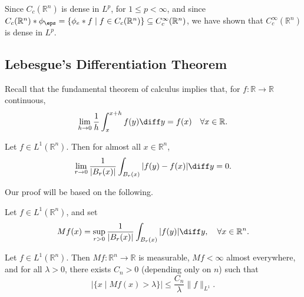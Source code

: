 \documentclass[12pt]{article}
\begin{document}
Since $C_c(\mathbb{R}^n)$ is dense in $L^p$, for $1 \leq p < \infty$, and since $C_c(\mathbb{R}^n) \ast \phi_\eps = \{\phi_e \ast f \mid f \in C_c(\mathbb{R}^n)\} \subseteq C_c^\infty(\mathbb{R}^n)$, we have shown that $C_c^\infty(\mathbb{R}^n)$ is dense in $L^p$.

\subsection{Lebesgue's Differentiation Theorem}
\label{sub:leb_diff}

Recall that the fundamental theorem of calculus implies that, for $f : \mathbb{R} \to \mathbb{R}$ continuous,
\[
\lim_{h \to 0} \frac{1}{h} \int_x^{x + h} f(y) \diff y = f(x) \quad \forall x \in \mathbb{R}.
\]

\begin{theorem}
	Let $f \in L^1(\mathbb{R}^n)$. Then for almost all $x \in \mathbb{R}^n$,
	\[
	\lim_{r \to 0} \frac{1}{|B_r(x)|} \int_{B_r(x)} |f(y) - f(x)| \diff y = 0.
	\]
\end{theorem}

Our proof will be based on the following.

\begin{definition}
	Let $f \in L^1(\mathbb{R}^n)$, and set
	\[
	M f(x) = \sup_{r > 0} \frac{1}{|B_r(x)|} \int_{B_r(x)} |f(y)| \diff y, \quad \forall x \in \mathbb{R}^n.
	\]
\end{definition}

\begin{lemma}
	Let $f \in L^1(\mathbb{R}^n)$. Then $M f : \mathbb{R}^n \to \mathbb{R}$ is measurable, $Mf < \infty$ almost everywhere, and for all $\lambda > 0$, there exists $C_n > 0$ (depending only on $n$) such that
	\[
		|\{x \mid M f(x) > \lambda \}| \leq \frac{C_n}{\lambda} \|f\|_{L^1}.
	\]
\end{lemma}
\end{document}
